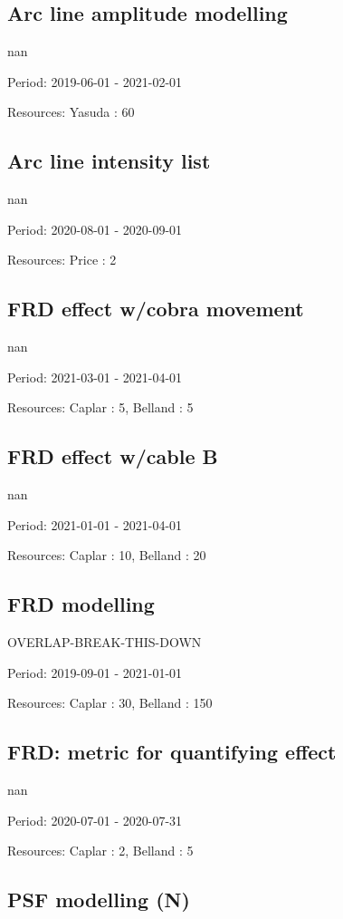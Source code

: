 \subsection{Arc line amplitude modelling}

nan

Period: 2019-06-01 - 2021-02-01

Resources: Yasuda : 60

\subsection{Arc line intensity list}

nan

Period: 2020-08-01 - 2020-09-01

Resources: Price : 2

\subsection{FRD effect w/cobra movement}

nan

Period: 2021-03-01 - 2021-04-01

Resources: Caplar : 5, Belland : 5

\subsection{FRD effect w/cable B}

nan

Period: 2021-01-01 - 2021-04-01

Resources: Caplar : 10, Belland : 20

\subsection{FRD modelling}

OVERLAP-BREAK-THIS-DOWN

Period: 2019-09-01 - 2021-01-01

Resources: Caplar : 30, Belland : 150

\subsection{FRD: metric for quantifying effect}

nan

Period: 2020-07-01 - 2020-07-31

Resources: Caplar : 2, Belland : 5

\subsection{PSF modelling (N)}

